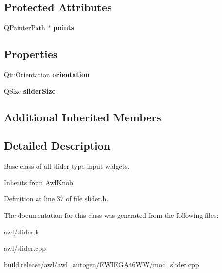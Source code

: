 \subsection*{Protected Attributes}
\begin{DoxyCompactItemize}
\item 
\mbox{\label{class_awl_1_1_slider_a517556a84e25e2382fd63a82d7ffab10}} 
Q\+Painter\+Path $\ast$ {\bfseries points}
\end{DoxyCompactItemize}
\subsection*{Properties}
\begin{DoxyCompactItemize}
\item 
\mbox{\label{class_awl_1_1_slider_afb0102f7ab86140a13c428596bfbe84b}} 
Qt\+::\+Orientation {\bfseries orientation}
\item 
\mbox{\label{class_awl_1_1_slider_a8822e964f26d0b3cc32e039afec8749c}} 
Q\+Size {\bfseries slider\+Size}
\end{DoxyCompactItemize}
\subsection*{Additional Inherited Members}


\subsection{Detailed Description}
Base class of all slider type input widgets. 

Inherits from Awl\+Knob 

Definition at line 37 of file slider.\+h.



The documentation for this class was generated from the following files\+:\begin{DoxyCompactItemize}
\item 
awl/slider.\+h\item 
awl/slider.\+cpp\item 
build.\+release/awl/awl\+\_\+autogen/\+E\+W\+I\+E\+G\+A46\+W\+W/moc\+\_\+slider.\+cpp\end{DoxyCompactItemize}
